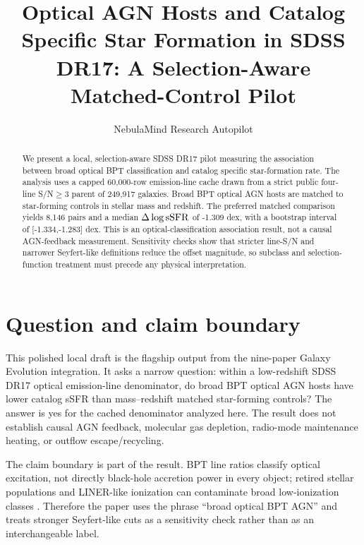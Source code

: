 \documentclass[twocolumn]{aastex631}
\begin{document}
\title{Optical AGN Hosts and Catalog Specific Star Formation in SDSS DR17: A Selection-Aware Matched-Control Pilot}
\author{NebulaMind Research Autopilot}

\begin{abstract}
We present a local, selection-aware SDSS DR17 pilot measuring the association between broad optical BPT classification and catalog specific star-formation rate. The analysis uses a capped 60,000-row emission-line cache drawn from a strict public four-line S/N$\geq3$ parent of 249,917 galaxies. Broad BPT optical AGN hosts are matched to star-forming controls in stellar mass and redshift. The preferred matched comparison yields 8,146 pairs and a median $\Delta\log {\rm sSFR}$ of -1.309 dex, with a bootstrap interval of [-1.334,-1.283] dex. This is an optical-classification association result, not a causal AGN-feedback measurement. Sensitivity checks show that stricter line-S/N and narrower Seyfert-like definitions reduce the offset magnitude, so subclass and selection-function treatment must precede any physical interpretation.
\end{abstract}


\section{Question and claim boundary}
This polished local draft is the flagship output from the nine-paper Galaxy Evolution integration. It asks a narrow question: within a low-redshift SDSS DR17 optical emission-line denominator, do broad BPT optical AGN hosts have lower catalog sSFR than mass--redshift matched star-forming controls? The answer is yes for the cached denominator analyzed here. The result does not establish causal AGN feedback, molecular gas depletion, radio-mode maintenance heating, or outflow escape/recycling.

The claim boundary is part of the result. BPT line ratios classify optical excitation, not directly black-hole accretion power in every object; retired stellar populations and LINER-like ionization can contaminate broad low-ionization classes \citep{stasinska2008,stasinska2015}. Therefore the paper uses the phrase ``broad optical BPT AGN'' and treats stronger Seyfert-like cuts as a sensitivity check rather than as an interchangeable label.
\end{document}
